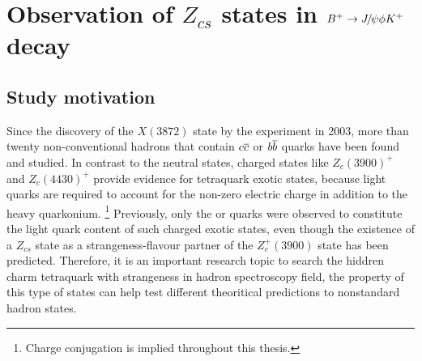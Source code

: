 \chapter{Observation of $Z_{cs}$ states in ${{{B}^+}}\rightarrow{\ensuremath{{J\mskip -3mu/\mskip -2mu\psi}}}\phi{\ensuremath{{K}^+}}$ decay}
\label{chap:Zcs_study}

\section{Study motivation}

Since the discovery of the $X(3872)$ state by the \belle experiment in 2003\supercite{PhysRevLett.91.262001}, 
more than twenty non-conventional hadrons that contain ${{c}{\overline {{c}}}}$ or ${{b}{\overline {{b}}}}$ quarks have been found and studied\supercite{PDG2020}. 
In contrast to the neutral states, 
charged states like $Z_c(3900)^+$\supercite{PhysRevLett.110.252001,PhysRevLett.110.252002} and $Z_c(4430)^+$\supercite{Choi:2007wga, Chilikin:2013tch, LHCb-PAPER-2014-014} provide evidence for tetraquark exotic states, 
because light quarks are required to account for the non-zero electric charge in addition to the heavy quarkonium.
\footnote{Charge conjugation is implied throughout this thesis.} 
Previously, 
only the \uquark or \dquark quarks were observed to constitute the light quark content of such charged exotic states, 
even though the existence of a $Z_{cs}$ state as a strangeness-flavour partner of the $Z^+_c(3900)$ state 
has been predicted\supercite{Voloshin:2019ilw,Dias:2013qga,Chen:2013wca,Ferretti:2020ewe,Lee:2008uy}.
Therefore,
it is an important research topic to search the hiddren charm tetraquark with strangeness in hadron spectroscopy field,
the property of this type of states can help test different theoritical predictions to nonstandard hadron states. 

